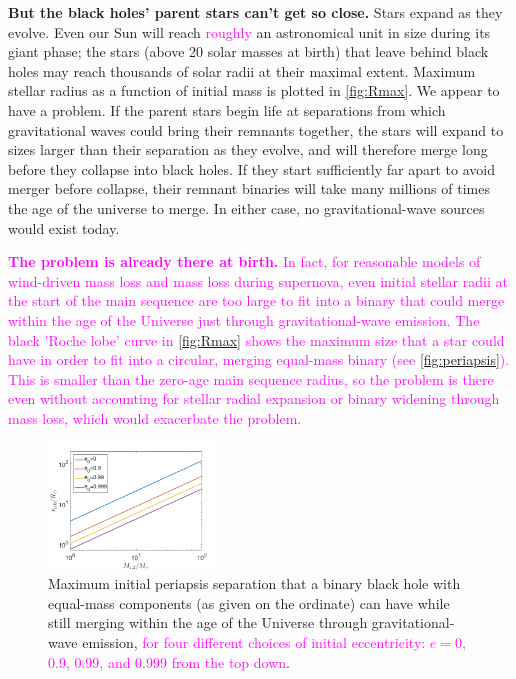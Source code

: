 \documentclass[iop,onecolumn]{revtex4}
\newcommand{\ilya}[1]{\textcolor{magenta}{#1}}
\begin{document}
\textbf{But the black holes' parent stars can't get so close.} Stars expand as they evolve. Even our Sun will reach \ilya{roughly} an astronomical unit in size during its giant phase; the stars (above 20 solar masses at birth) that leave behind black holes may reach thousands of solar radii at their maximal extent. Maximum stellar radius as a function of initial mass is plotted in \autoref{fig:Rmax}. We appear to have a problem. If the parent stars begin life at separations from which gravitational waves could bring their remnants together, the stars will expand to sizes larger than their separation as they evolve, and will therefore merge long before they collapse into black holes. If they start sufficiently far apart to avoid merger before collapse, their remnant binaries will take many millions of times the age of the universe to merge. In either case, no gravitational-wave sources would exist today. 

\ilya{\textbf{The problem is already there at birth.} In fact, for reasonable models of wind-driven mass loss and mass loss during supernova, even initial stellar radii at the start of the main sequence are too large to fit into a binary that could merge within the age of the Universe just through gravitational-wave emission.  The black 'Roche lobe' curve in \autoref{fig:Rmax} shows the maximum size that a star could have in order to fit into a circular, merging equal-mass binary (see \autoref{fig:periapsis}).  This is smaller than the zero-age main sequence radius, so the problem is there even without accounting for stellar radial expansion or binary widening through mass loss, which would exacerbate the problem.}

 
\begin{figure}
	\centering
	\includegraphics[width=0.4\textwidth]{M-rp-log.png}
	\caption{Maximum initial periapsis separation that a binary black hole with equal-mass components (as given on the ordinate) can have while still merging within the age of the Universe through gravitational-wave emission, \ilya{for four different choices of initial eccentricity: $e=0$, 0.9, 0.99, and 0.999 from the top down}.\label{fig:periapsis}}
\end{figure}
	
\end{document}
